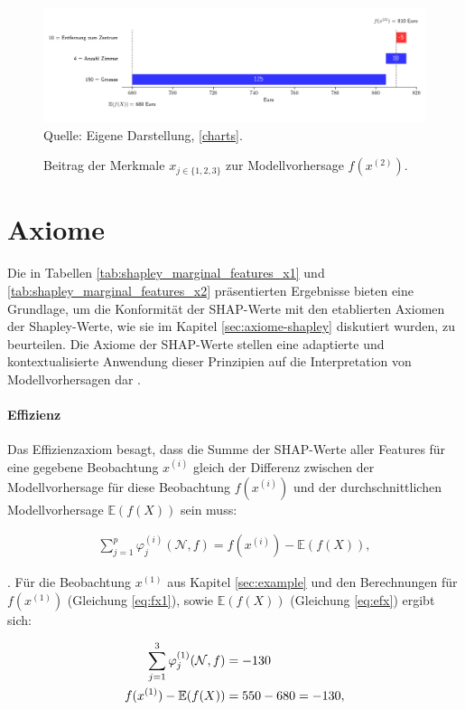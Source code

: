 \begin{figure}[H]
    \caption{Beitrag der Merkmale $x_{j \in \{1, 2, 3\}}$ zur Modellvorhersage $f(x^{(2)})$.}
    \includegraphics[width=1\textwidth]{../scripts/images/model-output-x2.png}
    Quelle: Eigene Darstellung, \ref{charts}.
    \label{pic:model-fx2}
\end{figure}


\section{Axiome}

Die in Tabellen \ref{tab:shapley_marginal_features_x1} und \ref{tab:shapley_marginal_features_x2} präsentierten Ergebnisse bieten eine Grundlage, 
um die Konformität der SHAP-Werte mit den etablierten Axiomen der Shapley-Werte, wie sie im 
Kapitel \ref{sec:axiome-shapley} diskutiert wurden, zu beurteilen. Die Axiome der SHAP-Werte stellen 
eine adaptierte und kontextualisierte Anwendung dieser Prinzipien auf die Interpretation von 
Modellvorhersagen dar \cite{NIPS2017_8a20a862}.


\paragraph{Effizienz}

Das Effizienzaxiom besagt, dass die Summe der SHAP-Werte aller Features für eine gegebene Beobachtung $x^{(i)}$ 
gleich der Differenz zwischen der Modellvorhersage für diese Beobachtung $f(x^{(i)})$ 
und der durchschnittlichen Modellvorhersage $\mathbb{E}(f(X))$ sein muss:

\begin{align}
    \sum_{j=1}^{p}\varphi_j^{(i)}(\mathcal{N}, f) = f(x^{(i)}) - \mathbb{E}(f(X)),
\end{align}

\cite[S. 221]{Molnar_2022}. Für die Beobachtung $x^{(1)}$ aus Kapitel \ref{sec:example} und den Berechnungen 
für $f(x^{(1)})$ (Gleichung \ref{eq:fx1}), sowie $\mathbb{E}(f(X))$ (Gleichung \ref{eq:efx}) ergibt sich:

\begin{align}
    \sum_{j=1}^{3}\varphi_j^{(1)}(\mathcal{N}, f) &=  -130 \\ \notag
    f(x^{(1)}) - \mathbb{E}(f(X)) &= 550 - 680 = -130,   
\end{align}

